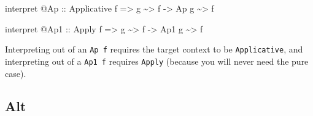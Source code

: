 \documentclass[]{article}
\newenvironment{Shaded}{}{}
\newcommand{\DataTypeTok}[1]{\textcolor[rgb]{0.56,0.13,0.00}{#1}}
\newcommand{\NormalTok}[1]{#1}
\newcommand{\OperatorTok}[1]{\textcolor[rgb]{0.40,0.40,0.40}{#1}}
\newcommand{\OtherTok}[1]{\textcolor[rgb]{0.00,0.44,0.13}{#1}}
\begin{document}
\begin{itemize}
\begin{Shaded}
\begin{Highlighting}[]
\NormalTok{interpret }\OperatorTok{@}\DataTypeTok{Ap}
\OtherTok{    ::} \DataTypeTok{Applicative}\NormalTok{ f}
    \OtherTok{=\textgreater{}}\NormalTok{ g }\OperatorTok{\textasciitilde{}\textgreater{}}\NormalTok{ f}
    \OtherTok{{-}\textgreater{}} \DataTypeTok{Ap}\NormalTok{ g }\OperatorTok{\textasciitilde{}\textgreater{}}\NormalTok{ f}

\NormalTok{interpret }\OperatorTok{@}\DataTypeTok{Ap1}
\OtherTok{    ::} \DataTypeTok{Apply}\NormalTok{ f}
    \OtherTok{=\textgreater{}}\NormalTok{ g }\OperatorTok{\textasciitilde{}\textgreater{}}\NormalTok{ f}
    \OtherTok{{-}\textgreater{}} \DataTypeTok{Ap1}\NormalTok{ g }\OperatorTok{\textasciitilde{}\textgreater{}}\NormalTok{ f}
\end{Highlighting}
\end{Shaded}

  Interpreting out of an \texttt{Ap\ f} requires the target context to be
  \texttt{Applicative}, and interpreting out of a \texttt{Ap1\ f} requires
  \texttt{Apply} (because you will never need the pure case).
\end{itemize}

\subsection{Alt}\label{alt}
\end{document}
